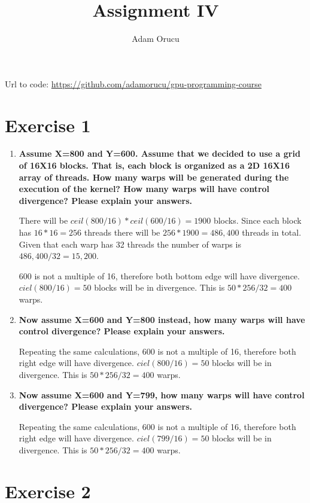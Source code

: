 \documentclass[a4paper,11pt]{scrartcl}
\title{Assignment IV}
\author{Adam Orucu}
\begin{document}
\maketitle

Url to code: \url{https://github.com/adamorucu/gpu-programming-course}

\section*{Exercise 1}

\begin{enumerate}
    \item \textbf{Assume X=800 and Y=600. Assume that we decided to use a grid of 16X16 blocks. That is, each block is organized as a 2D 16X16 array of threads. How many warps will be generated during the execution of the kernel? How many warps will have control divergence? Please explain your answers.}

    There will be $ceil(800/16) * ceil(600/16) = 1900$ blocks. Since each block has $16*16=256$ threads there will be $256 * 1900 = 486,400$ threads in total. Given that each warp has 32 threads the number of warps is $486,400 / 32 = 15,200$.

    600 is not a multiple of 16, therefore both bottom edge will have divergence. $ciel(800/16) = 50$ blocks will be in divergence. This is $50*256/32= 400$ warps.

    \item \textbf{Now assume X=600 and Y=800 instead, how many warps will have control divergence? Please explain your answers.}
    
    Repeating the same calculations, 600 is not a multiple of 16, therefore both right edge will have divergence. $ciel(800/16) = 50$ blocks will be in divergence. This is $50*256/32= 400$ warps.

    \item \textbf{Now assume X=600 and Y=799, how many warps will have control divergence? Please explain your answers.}

    Repeating the same calculations, 600 is not a multiple of 16, therefore both right edge will have divergence. $ciel(799/16) = 50$ blocks will be in divergence. This is $50*256/32= 400$ warps.

\end{enumerate}



\section*{Exercise 2}
\end{document}
